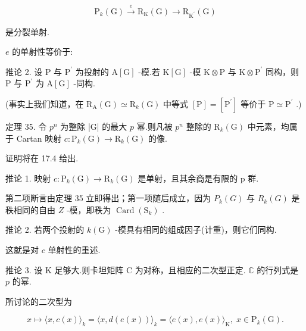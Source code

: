 \documentclass[10pt]{article}
\begin{document}
\[
{\mathrm{P}}_{k}\left( \mathrm{G}\right) \overset{e}{ \rightarrow  }{\mathrm{R}}_{\mathrm{K}}\left( \mathrm{G}\right)  \rightarrow  {\mathrm{R}}_{{\mathrm{K}}^{\prime }}\left( \mathrm{G}\right)
\]

是分裂单射.

\(e\) 的单射性等价于:

推论 2. 设 \(\mathrm{P}\) 与 \({\mathrm{P}}^{\prime }\) 为投射的 \(\mathrm{A}\left\lbrack  \mathrm{G}\right\rbrack\) -模.若 \(\mathrm{K}\left\lbrack  \mathrm{G}\right\rbrack\) -模 \(\mathrm{K} \otimes  \mathrm{P}\) 与 \(\mathrm{K} \otimes  {\mathrm{P}}^{\prime }\) 同构，则 \(\mathrm{P}\) 与 \({\mathrm{P}}^{\prime }\) 为 \(\mathrm{A}\left\lbrack  \mathrm{G}\right\rbrack\) -同构.

(事实上我们知道，在 \({\mathrm{R}}_{\mathrm{A}}\left( \mathrm{G}\right)  \simeq  {\mathrm{R}}_{k}\left( \mathrm{G}\right)\) 中等式 \(\left\lbrack  \mathrm{P}\right\rbrack   = \left\lbrack  {\mathrm{P}}^{\prime }\right\rbrack\) 等价于 \(\mathrm{P} \simeq  {\mathrm{P}}^{\prime }\) .)

定理 35. 令 \({p}^{n}\) 为整除 |G| 的最大 \(p\) 幂.则凡被 \({p}^{n}\) 整除的 \({\mathrm{R}}_{k}\left( \mathrm{G}\right)\) 中元素，均属于 Cartan 映射 \(c : {\mathrm{P}}_{k}\left( \mathrm{G}\right)  \rightarrow  {\mathrm{R}}_{k}\left( \mathrm{G}\right)\) 的像.

证明将在 17.4 给出.

推论 1. 映射 \(c : {\mathrm{P}}_{k}\left( \mathrm{G}\right)  \rightarrow  {\mathrm{R}}_{k}\left( \mathrm{G}\right)\) 是单射，且其余商是有限的 p 群.

第二项断言由定理 35 立即得出；第一项随后成立，因为 \({P}_{k}\left( G\right)\) 与 \({R}_{k}\left( G\right)\) 是秩相同的自由 \(Z\) -模，即秩为 \(\operatorname{Card}\left( {\mathrm{S}}_{k}\right)\) .

推论 2. 若两个投射的 \(k\left( \mathrm{G}\right)\) -模具有相同的组成因子(计重)，则它们同构.

这就是对 \(c\) 单射性的重述.

推论 3. 设 \(\mathrm{K}\) 足够大.则卡坦矩阵 \(\mathrm{C}\) 为对称，且相应的二次型正定. \(\mathbb{C}\) 的行列式是 \(p\) 的幂.

所讨论的二次型为

\[
x \mapsto  \langle x,c\left( x\right) {\rangle }_{k} = \langle x,d\left( {e\left( x\right) }\right) {\rangle }_{k} = \langle e\left( x\right) ,e\left( x\right) {\rangle }_{\mathrm{K}},\;x \in  {\mathrm{P}}_{k}\left( \mathrm{G}\right) .
\]
\end{document}
